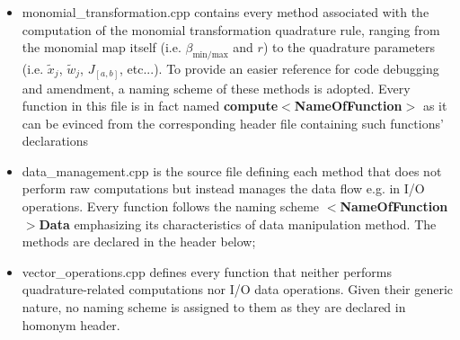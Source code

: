 \documentclass[a4paper, twosided]{book}
\begin{document}
\begin{itemize}
    \item \colorbox{poliGrayBlue}{monomial\_transformation.cpp} contains every method associated with the computation of the monomial transformation quadrature rule, ranging from the monomial map itself (i.e. $\beta_{\text{min/max}}$ and $r$) to the quadrature parameters (i.e. $\tilde{x}_j$, $\tilde{w}_j$, $J_{[a,b]}$, etc...). To provide an easier reference for code debugging and amendment, a naming scheme of these methods is adopted. Every function in this file is in fact named \color{poliDarkBlue} \textbf{compute}$\boldsymbol{<}$\textbf{NameOfFunction$\boldsymbol{>}$} \color{black} as it can be evinced from the corresponding header file containing such functions' declarations
    
    \vspace{0.2cm}
    
    \item \colorbox{poliGrayBlue}{data\_management.cpp} is the source file defining each method that does not perform raw computations but instead manages the data flow e.g. in I/O operations. Every function follows the naming scheme \color{poliDarkBlue} $\boldsymbol{<}$\textbf{NameOfFunction$\boldsymbol{>}$}\textbf{Data} \color{black} emphasizing its characteristics of data manipulation method. The methods are declared in the header below;

    \newpage
    \vspace{0.2cm}
    \vspace{0.3cm}
    
    \item \colorbox{poliGrayBlue}{vector\_operations.cpp} defines every function that neither performs quadrature-related computations nor I/O data operations. Given their generic nature, no naming scheme is assigned to them as they are declared in homonym header.
    
    \vspace{0.15cm}
\end{itemize}
\end{document}
